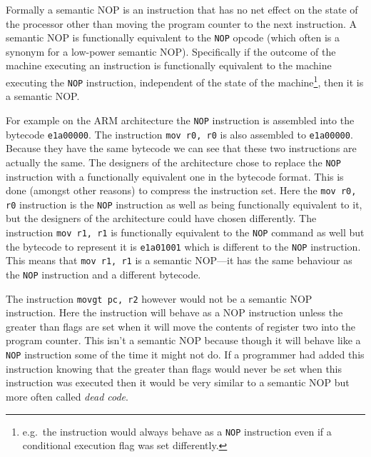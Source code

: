 \documentclass[10pt,]{book}
\begin{document}
Formally a semantic NOP is an instruction that has no net effect on the
state of the processor other than moving the program counter to the next
instruction. A semantic NOP is functionally equivalent to the
\lstinline!NOP! opcode (which often is a synonym for a low-power
semantic NOP). Specifically if the outcome of the machine executing an
instruction is functionally equivalent to the machine executing the
\lstinline!NOP! instruction, independent of the state of the
machine\footnote{e.g.~the instruction would always behave as a
  \lstinline!NOP! instruction even if a conditional execution flag was
  set differently.}, then it is a semantic NOP.

For example on the ARM architecture\autocite{Seal:2000vd} the
\lstinline!NOP! instruction is assembled into the bytecode
\lstinline!e1a00000!. The instruction \lstinline!mov r0, r0! is also
assembled to \lstinline!e1a00000!. Because they have the same bytecode
we can see that these two instructions are actually the same. The
designers of the architecture chose to replace the \lstinline!NOP!
instruction with a functionally equivalent one in the bytecode format.
This is done (amongst other reasons) to compress the instruction set.
Here the \lstinline!mov r0, r0! instruction is the \lstinline!NOP!
instruction as well as being functionally equivalent to it, but the
designers of the architecture could have chosen differently. The
instruction \lstinline!mov r1, r1! is functionally equivalent to the
\lstinline!NOP! command as well but the bytecode to represent it is
\lstinline!e1a01001! which is different to the \lstinline!NOP!
instruction. This means that \lstinline!mov r1, r1! is a semantic
NOP---it has the same behaviour as the \lstinline!NOP! instruction and a
different bytecode.

The instruction \lstinline!movgt pc, r2! however would not be a semantic
NOP instruction. Here the instruction will behave as a NOP instruction
unless the greater than flags are set when it will move the contents of
register two into the program counter. This isn't a semantic NOP because
though it will behave like a \lstinline!NOP! instruction some of the
time it might not do. If a programmer had added this instruction knowing
that the greater than flags would never be set when this instruction was
executed then it would be very similar to a semantic NOP but more often
called \emph{dead code}\autocite{Collberg:1997vt}.
\end{document}
